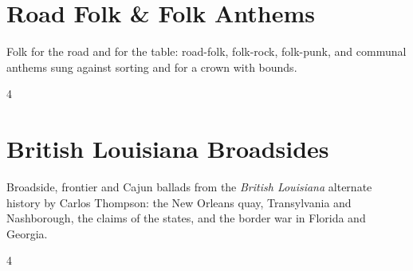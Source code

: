 \documentclass[a4paper,landscape]{memoir}
\begin{document}
\chapter{Road Folk \& Folk Anthems}
Folk for the road and for the table: road-folk, folk-rock, folk-punk, and communal anthems sung against sorting and for a crown with bounds.
\clearpage\begin{multicols*}{4}
\end{multicols*}

\chapter{British Louisiana Broadsides}
Broadside, frontier and Cajun ballads from the \emph{British Louisiana} alternate history by Carlos Thompson: the New Orleans quay, Transylvania and Nashborough, the claims of the states, and the border war in Florida and Georgia.
\clearpage\begin{multicols*}{4}
\end{multicols*}
\end{document}
